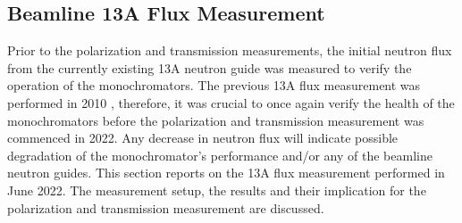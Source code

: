 
\subsection{Beamline 13A Flux Measurement}
   
Prior to the polarization and transmission measurements, the initial neutron flux from the currently existing 13A neutron guide was measured to verify the operation of the monochromators. The previous 13A flux measurement was performed in 2010 \cite{Fomin2015}, therefore, it was crucial to once again verify the health of the monochromators before the polarization and transmission measurement was commenced in 2022. Any decrease in neutron flux will indicate possible degradation of the monochromator's performance and/or any of the beamline neutron guides. %
This section reports on the 13A flux measurement performed in June 2022. The measurement setup, the results and their implication for the polarization and transmission measurement are discussed.

